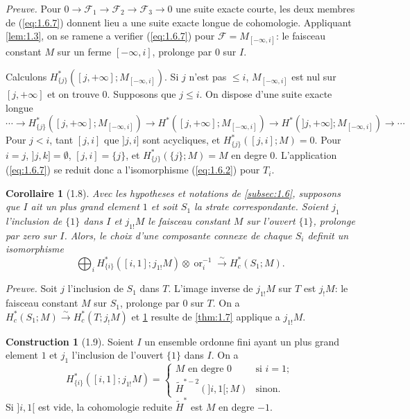 \documentclass[11pt,a4paper]{article}
\theoremstyle{plain}
\newtheorem{corollary}[theorem]{Corollaire}
\theoremstyle{definition}
\newtheorem{construction}[theorem]{Construction}
\newcommand{\ori}{\operatorname{or}}
\begin{document}
\noindent\textit{Preuve.} Pour $0 \to \mathcal{F}_1 \to \mathcal{F}_2 \to \mathcal{F}_3 \to 0$ une suite exacte courte, les deux membres de (\ref{eq:1.6.7}) donnent lieu a une suite exacte longue de cohomologie. Appliquant \ref{lem:1.3}, on se ramene a verifier (\ref{eq:1.6.7}) pour $\mathcal{F} = M_{[-\infty,i]}$: le faisceau constant $M$ sur un ferme $[-\infty,i]$, prolonge par $0$ sur $I$.

Calculons $H^*_{\{j\}}([j,+\infty];M_{[-\infty,i]})$. Si $j$ n'est pas $\leq i$, $M_{[-\infty,i]}$ est nul sur $[j,+\infty]$ et on trouve $0$. Supposons que $j \leq i$. On dispose d'une suite exacte longue
\[\cdots \to H^*_{\{j\}}([j,+\infty];M_{[-\infty,i]}) \to H^*([j,+\infty];M_{[-\infty,i]}) \to H^*(]j,+\infty];M_{[-\infty,i]}) \to \cdots\]
Pour $j < i$, tant $[j,i]$ que $]j,i]$ sont acycliques, et $H^*_{\{j\}}([j,i];M) = 0$. Pour $i = j$, $]j,k] = \emptyset$, $[j,i] = \{j\}$, et $H^*_{\{j\}}(\{j\};M) = M$ en degre $0$. L'application (\ref{eq:1.6.7}) se reduit donc a l'isomorphisme (\ref{eq:1.6.2}) pour $T_i$.

\begin{corollary}[1.8]\label{cor:1.8}
Avec les hypotheses et notations de \ref{subsec:1.6}, supposons que $I$ ait un plus grand element $1$ et soit $S_1$ la strate correspondante. Soient $j_1$ l'inclusion de $\{1\}$ dans $I$ et $j_{1!}M$ le faisceau constant $M$ sur l'ouvert $\{1\}$, prolonge par zero sur $I$. Alors, le choix d'une composante connexe de chaque $S_i$ definit un isomorphisme
\begin{equation}\label{eq:1.8.1}
\bigoplus_i H^*_{\{i\}}([i,1];j_{1!}M) \otimes \ori_i^{-1} \xrightarrow{\sim} H^*_c(S_1;M).
\tag{1.8.1}
\end{equation}
\end{corollary}

\noindent\textit{Preuve.} Soit $j$ l'inclusion de $S_1$ dans $T$. L'image inverse de $j_{1!}M$ sur $T$ est $j_!M$: le faisceau constant $M$ sur $S_1$, prolonge par $0$ sur $T$. On a $H^*_c(S_1;M) \xrightarrow{\sim} H^*_c(T;j_!M)$ et \ref{cor:1.8} resulte de \ref{thm:1.7} applique a $j_{1!}M$.

\begin{construction}[1.9]\label{constr:1.9}
Soient $I$ un ensemble ordonne fini ayant un plus grand element $1$ et $j_1$ l'inclusion de l'ouvert $\{1\}$ dans $I$. On a
\[
H^*_{\{i\}}([i,1];j_{1!}M) = \begin{cases}
M \text{ en degre } 0 & \text{si } i = 1;\\
\widetilde{H}^{*-2}(]i,1[;M) & \text{sinon}.
\end{cases}
\]
Si $]i,1[$ est vide, la cohomologie reduite $\widetilde{H}^*$ est $M$ en degre $-1$.
\end{construction}
\end{document}
